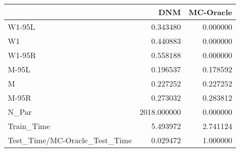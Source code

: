 \begin{tabular}{lrr}
\toprule
{} &          DNM &  MC-Oracle \\
\midrule
W1-95L                        &     0.343480 &   0.000000 \\
W1                            &     0.440883 &   0.000000 \\
W1-95R                        &     0.558188 &   0.000000 \\
M-95L                         &     0.196537 &   0.178592 \\
M                             &     0.227252 &   0.227252 \\
M-95R                         &     0.273032 &   0.283812 \\
N\_Par                         &  2018.000000 &   0.000000 \\
Train\_Time                    &     5.493972 &   2.741124 \\
Test\_Time/MC-Oracle\_Test\_Time &     0.029472 &   1.000000 \\
\bottomrule
\end{tabular}
